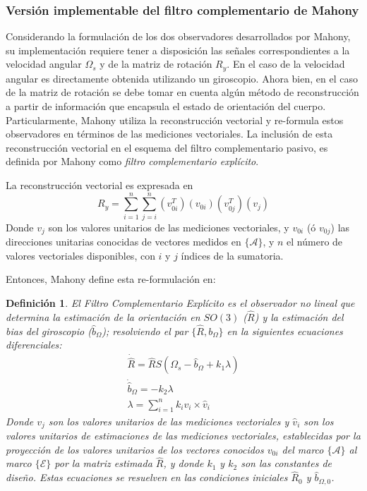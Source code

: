 \documentclass[10pt]{report}
\numberwithin{equation}{chapter}
\numberwithin{algorithm}{chapter}
\newtheorem {defin}{Definición}[section]
\newcommand{\bias}{\emph{bias} }
\newcommand{\marco}[1]{\{\mathcal{#1}\}}
\begin{document}
\subsubsection{Versión implementable del filtro complementario de Mahony}
Considerando la formulación de los dos observadores desarrollados por Mahony, su implementación requiere tener a disposición las señales correspondientes a la velocidad angular $\Omega_s$ y de la matriz de rotación $R_y$. En el caso de la velocidad angular es directamente obtenida utilizando un giroscopio. Ahora bien, en el caso de la matriz de rotación se debe tomar en cuenta algún método de reconstrucción a partir de información que encapsula el estado de orientación del cuerpo. Particularmente, Mahony utiliza la reconstrucción vectorial y re-formula estos observadores en términos de las mediciones vectoriales. La inclusión de esta reconstrucción vectorial en el esquema del filtro complementario pasivo, es definida por Mahony como \emph{filtro complementario explícito}.\par
La reconstrucción vectorial es expresada en \begin{equation}\label{aam_ecc1}
R_y=\sum_{i=1}^n\sum_{j=i}^n(v_{0i}^T)(v_{0i})(v_{0j}^T)(v_{j})
\end{equation} Donde $v_j$ son los valores unitarios de las mediciones vectoriales, y $v_{0i}$ (ó $v_{0j}$) las direcciones unitarias conocidas de vectores medidos en $\marco{A}$, y $n$ el número de valores vectoriales disponibles, con $i$ y $j$ índices de la sumatoria.\par
Entonces, Mahony define esta re-formulación en:
\begin{defin}\label{aam_def1}
El Filtro Complementario Explícito es el observador no lineal que determina la estimación de la orientación en $SO(3)$ ($\hat{R}$) y la estimación del \bias del giroscopio ($\hat{b}_{\Omega}$); resolviendo el par $\{\hat{R},b_{\Omega}\}$ en la siguientes ecuaciones diferenciales:
\begin{equation}\label{aam2}
\begin{array}{c}
\dot{\hat{R}}=\hat{R}S(\Omega_s-\hat{b}_\Omega+k_1\lambda)\\
\dot{\hat{b}}_{\Omega}=-k_2\lambda\\
\lambda=\sum_{i=1}^{n}k_iv_i\times\hat{v}_i
\end{array}
\end{equation}
Donde $v_j$ son los valores unitarios de las mediciones vectoriales y $\hat{v}_i$ son los valores unitarios de estimaciones de las mediciones vectoriales, establecidas por la proyección de los valores unitarios de los vectores conocidos $v_{0i}$ del marco $\marco{A}$ al marco $\marco{E}$ por la matriz estimada $\hat{R}$, y donde $k_1$ y $k_2$ son las constantes de diseño. Estas ecuaciones se resuelven en las condiciones iniciales $\hat{R}_0$ y $\hat{b}_{\Omega,0}$.
\end{defin}
\end{document}
